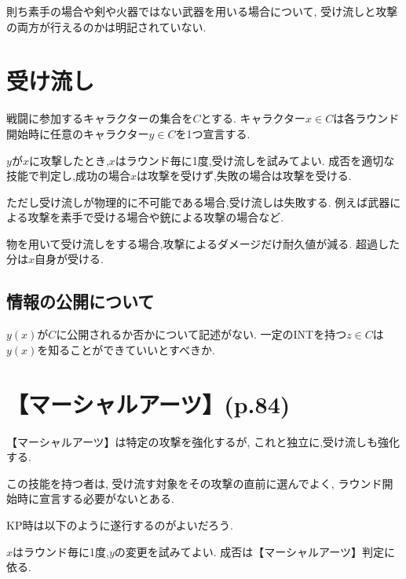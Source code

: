 \documentclass{jsarticle}
\begin{document}
則ち素手の場合や剣や火器ではない武器を用いる場合について,
受け流しと攻撃の両方が行えるのかは明記されていない.

\section{受け流し}
戦闘に参加するキャラクターの集合を$C$とする.
キャラクター$x\in C$は各ラウンド開始時に任意のキャラクター$y\in C$を1つ宣言する.

$y$が$x$に攻撃したとき,$x$はラウンド毎に1度,受け流しを試みてよい.
成否を適切な技能で判定し,成功の場合$x$は攻撃を受けず,失敗の場合は攻撃を受ける.

ただし受け流しが物理的に不可能である場合,受け流しは失敗する.
例えば武器による攻撃を素手で受ける場合や銃による攻撃の場合など.

物を用いて受け流しをする場合,攻撃によるダメージだけ耐久値が減る.
超過した分は$x$自身が受ける.

\subsection*{情報の公開について}
$y(x)$が$C$に公開されるか否かについて記述がない.
一定のINTを持つ$z\in C$は$y(x)$を知ることができていいとすべきか.

\section{【マーシャルアーツ】(p.84)}
【マーシャルアーツ】は特定の攻撃を強化するが,
これと独立に,受け流しも強化する.

この技能を持つ者は,
受け流す対象をその攻撃の直前に選んでよく,
ラウンド開始時に宣言する必要がないとある.

KP時は以下のように遂行するのがよいだろう.

$x$はラウンド毎に1度,$y$の変更を試みてよい.
成否は【マーシャルアーツ】判定に依る.



\end{document}
